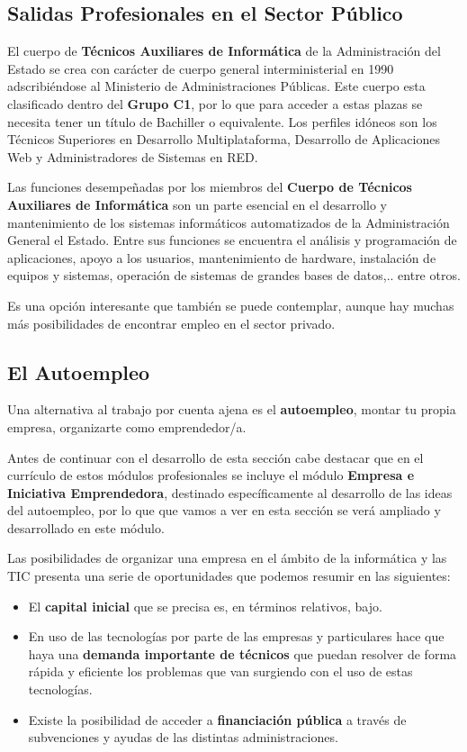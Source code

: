 \subsection{Salidas Profesionales en el Sector Público}
El cuerpo de \textbf{Técnicos Auxiliares de Informática} de la Administración del Estado se crea con carácter de cuerpo general interministerial en 1990 adscribiéndose al Ministerio de Administraciones Públicas. Este cuerpo esta clasificado dentro del \textbf{Grupo C1}, por lo que para acceder a estas plazas se necesita tener un título de Bachiller o equivalente. Los perfiles idóneos son los Técnicos Superiores en Desarrollo Multiplataforma, Desarrollo de Aplicaciones Web y Administradores de Sistemas en RED.

Las funciones desempeñadas por los miembros del \textbf{Cuerpo de Técnicos Auxiliares de Informática} son un parte esencial en el desarrollo y mantenimiento de los sistemas informáticos automatizados de la Administración General el Estado. Entre sus funciones se encuentra el análisis y programación de aplicaciones, apoyo a los usuarios,  mantenimiento de hardware, instalación de equipos y sistemas, operación de sistemas de grandes bases de datos,.. entre otros.

Es una opción interesante que también se puede contemplar, aunque hay muchas más posibilidades de encontrar empleo en el sector privado.

\subsection{El Autoempleo}
Una alternativa al trabajo por cuenta ajena es el \textbf{autoempleo}, montar tu propia empresa, organizarte como emprendedor/a.

Antes de continuar con el desarrollo de esta sección cabe destacar que en el currículo de estos módulos profesionales se incluye el módulo \textbf{Empresa e Iniciativa Emprendedora}, destinado específicamente al desarrollo de las ideas del autoempleo, por lo que que vamos a ver en esta sección se verá ampliado y desarrollado en este módulo.

Las posibilidades de organizar una empresa en el ámbito de la informática y las TIC presenta una serie de oportunidades que podemos resumir en las siguientes:

\begin{itemize}
    \item El \textbf{capital inicial} que se precisa es, en términos relativos, bajo.
    \item En uso de las tecnologías por parte de las empresas y particulares hace que haya una \textbf{demanda importante de técnicos} que puedan resolver de forma rápida y eficiente los problemas que van surgiendo con el uso de estas tecnologías.
    \item Existe la posibilidad de acceder a \textbf{financiación pública} a través de subvenciones y ayudas de las distintas administraciones.
\end{itemize}

